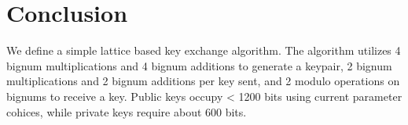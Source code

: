\documentclass[preprint]{iacrtrans}
\begin{document}
\section{Conclusion}
 We define a simple lattice based key exchange algorithm. The algorithm utilizes 4 bignum multiplications and 4 bignum additions to generate a keypair, 2 bignum multiplications and 2 bignum additions per key sent, and 2 modulo operations on bignums to receive a key. Public keys occupy < 1200 bits using current parameter cohices, while private keys require about 600 bits.
\end{document}
